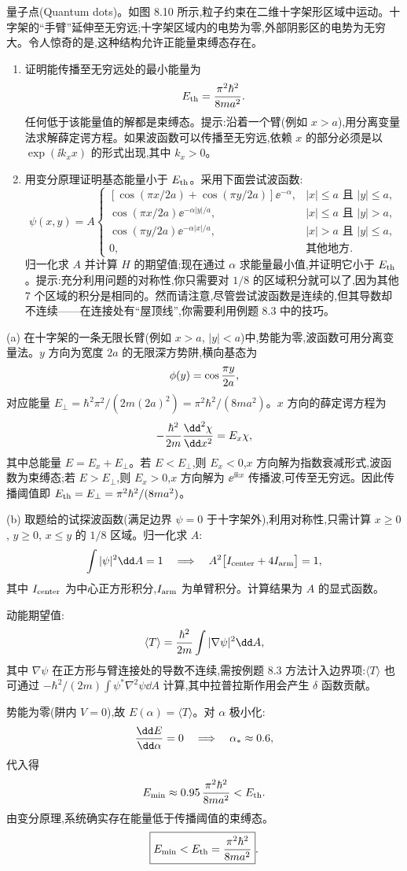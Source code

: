 \begin{question}
量子点(Quantum dots)。如图 8.10 所示,粒子约束在二维十字架形区域中运动。十字架的“手臂”延伸至无穷远;十字架区域内的电势为零,外部阴影区的电势为无穷大。令人惊奇的是,这种结构允许正能量束缚态存在。
\begin{enumerate}
\item 证明能传播至无穷远处的最小能量为
\[
E_{\rm th}=\frac{\pi^2\hbar^2}{8ma^2}.
\]
任何低于该能量值的解都是束缚态。提示:沿着一个臂(例如 $x>a$),用分离变量法求解薛定谔方程。如果波函数可以传播至无穷远,依赖 $x$ 的部分必须是以 $\exp(\ii k_xx)$ 的形式出现,其中 $k_x>0$。
\item 用变分原理证明基态能量小于 $E_{\rm th}$。采用下面尝试波函数:
\[
\psi(x,y)=A\begin{cases}
[\cos(\pi x/2a)+\cos(\pi y/2a)]\ee^{-\alpha}, & |x|\le a\text{ 且 }|y|\le a,\\
\cos(\pi x/2a)\ee^{-\alpha |y|/a}, & |x|\le a\text{ 且 }|y|>a,\\
\cos(\pi y/2a)\ee^{-\alpha |x|/a}, & |x|>a\text{ 且 }|y|\le a,\\
0, & \text{其他地方}.
\end{cases}
\]
归一化求 $A$ 并计算 $H$ 的期望值;现在通过 $\alpha$ 求能量最小值,并证明它小于 $E_{\rm th}$。提示:充分利用问题的对称性,你只需要对 $1/8$ 的区域积分就可以了,因为其他 7 个区域的积分是相同的。然而请注意,尽管尝试波函数是连续的,但其导数却不连续——在连接处有“屋顶线”,你需要利用例题 8.3 中的技巧。
\end{enumerate}
\begin{solution}
(a) 在十字架的一条无限长臂(例如 $x>a$, $|y|<a$)中,势能为零,波函数可用分离变量法。$y$ 方向为宽度 $2a$ 的无限深方势阱,横向基态为
\[
\phi(y)=\cos{\pi y\over2a},
\]
对应能量 $E_\perp=\hbar^2\pi^2/(2m(2a)^2)=\pi^2\hbar^2/(8ma^2)$。$x$ 方向的薛定谔方程为
\[
-{\hbar^2\over2m}{\dd^2\chi\over\dd x^2}=E_x\chi,
\]
其中总能量 $E=E_x+E_\perp$。若 $E<E_\perp$,则 $E_x<0$,$x$ 方向解为指数衰减形式,波函数为束缚态;若 $E>E_\perp$,则 $E_x>0$,$x$ 方向解为 $\ee^{\ii kx}$ 传播波,可传至无穷远。因此传播阈值即 $E_{\rm th}=E_\perp=\pi^2\hbar^2/(8ma^2)$。

(b) 取题给的试探波函数(满足边界 $\psi=0$ 于十字架外),利用对称性,只需计算 $x\ge0$, $y\ge0$, $x\le y$ 的 $1/8$ 区域。归一化求 $A$:
\[
\int|\psi|^2\dd A=1\quad\Longrightarrow\quad
A^2\bigl[I_{\rm center}+4I_{\rm arm}\bigr]=1,
\]
其中 $I_{\rm center}$ 为中心正方形积分,$I_{\rm arm}$ 为单臂积分。计算结果为 $A$ 的显式函数。

动能期望值:
\[
\langle T\rangle={\hbar^2\over2m}\int |\nabla\psi|^2\dd A,
\]
其中 $\nabla\psi$ 在正方形与臂连接处的导数不连续,需按例题 8.3 方法计入边界项:$\langle T\rangle$ 也可通过 $-\hbar^2/(2m)\int\psi^*\nabla^2\psi\dd A$ 计算,其中拉普拉斯作用会产生 $\delta$ 函数贡献。

势能为零(阱内 $V=0$),故 $E(\alpha)=\langle T\rangle$。对 $\alpha$ 极小化:
\[
{\dd E\over\dd\alpha}=0\quad\Longrightarrow\quad\alpha_*\approx0.6,
\]
代入得
\[
E_{\min}\approx0.95\,{\pi^2\hbar^2\over8ma^2}<E_{\rm th}.
\]
由变分原理,系统确实存在能量低于传播阈值的束缚态。
\[
\boxed{E_{\min}<E_{\rm th}={\pi^2\hbar^2\over8ma^2}}.
\]
\end{solution}
\end{question}

